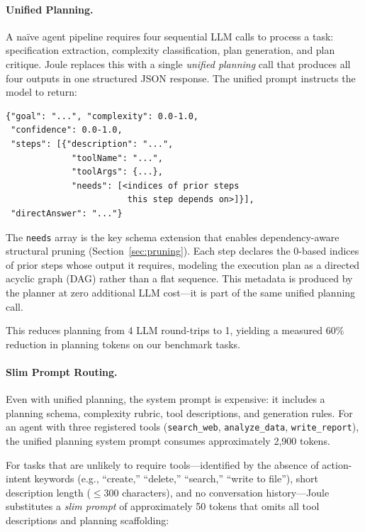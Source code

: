 \paragraph{Unified Planning.}
A na\"ive agent pipeline requires four sequential LLM calls to process a task: specification extraction, complexity classification, plan generation, and plan critique. Joule replaces this with a single \emph{unified planning} call that produces all four outputs in one structured JSON response. The unified prompt instructs the model to return:

\begin{verbatim}
{"goal": "...", "complexity": 0.0-1.0,
 "confidence": 0.0-1.0,
 "steps": [{"description": "...",
             "toolName": "...",
             "toolArgs": {...},
             "needs": [<indices of prior steps
                        this step depends on>]}],
 "directAnswer": "..."}
\end{verbatim}

\noindent The \texttt{needs} array is the key schema extension that enables dependency-aware structural pruning (Section~\ref{sec:pruning}). Each step declares the 0-based indices of prior steps whose output it requires, modeling the execution plan as a directed acyclic graph (DAG) rather than a flat sequence. This metadata is produced by the planner at zero additional LLM cost---it is part of the same unified planning call.

This reduces planning from 4 LLM round-trips to 1, yielding a measured 60\% reduction in planning tokens on our benchmark tasks.

\paragraph{Slim Prompt Routing.}
Even with unified planning, the system prompt is expensive: it includes a planning schema, complexity rubric, tool descriptions, and generation rules. For an agent with three registered tools (\texttt{search\_web}, \texttt{analyze\_data}, \texttt{write\_report}), the unified planning system prompt consumes approximately 2,900 tokens.

For tasks that are unlikely to require tools---identified by the absence of action-intent keywords (e.g., ``create,'' ``delete,'' ``search,'' ``write to file''), short description length ($\leq$300 characters), and no conversation history---Joule substitutes a \emph{slim prompt} of approximately 50 tokens that omits all tool descriptions and planning scaffolding:


